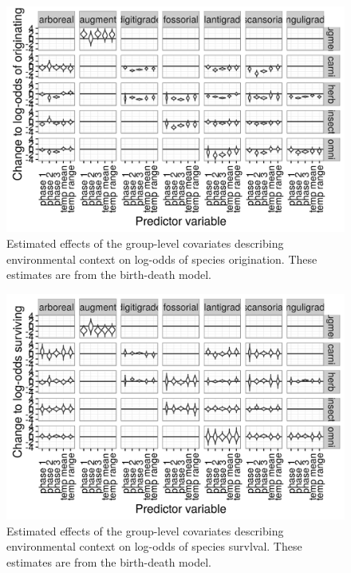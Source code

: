 \documentclass[12pt,letterpaper]{article}
\begin{document}
\begin{figure}[ht]
  \centering
  \includegraphics[width=\textwidth,height=0.8\textheight,keepaspectratio=true]{figure/group_on_origin_bd}
  \caption[Effects of group-level covariates on log-odds of ecotype origination as estimated from the the birth-death model]{Estimated effects of the group-level covariates describing environmental context on log-odds of species origination. These estimates are from the birth-death model.}
  \label{fig:group_origin_bd}
\end{figure}

\begin{figure}[ht]
  \centering
  \includegraphics[width=\textwidth,height=0.8\textheight,keepaspectratio=true]{figure/group_on_survival_bd}
  \caption[Effects of group-level covariates on log-odds of ecotype survival as estimated from the the birth-death model]{Estimated effects of the group-level covariates describing environmental context on log-odds of species survlval. These estimates are from the birth-death model.}
  \label{fig:group_surv_bd}
\end{figure}
\end{document}

